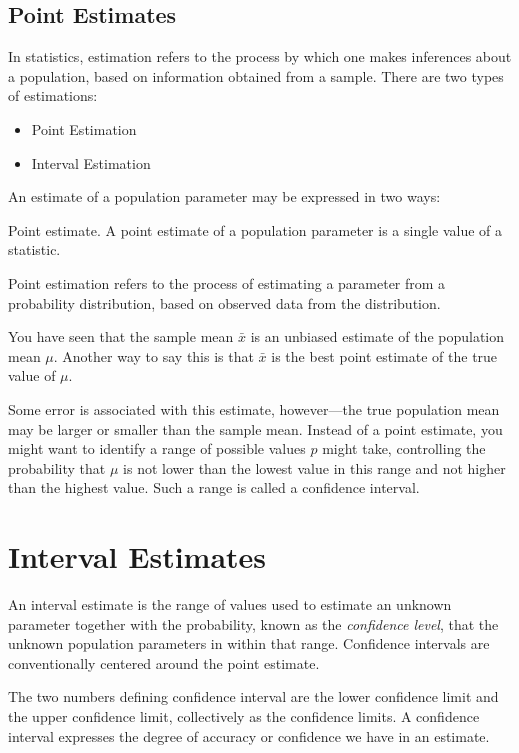 
\subsection{Point Estimates}

In statistics, estimation refers to the process by which one makes inferences about a population, based on information obtained from a sample.
There are two types of estimations:

\begin{itemize}
	\item Point Estimation
	\item Interval Estimation
\end{itemize}



An estimate of a population parameter may be expressed in two ways:

Point estimate. A point estimate of a population parameter is a single value of a statistic. 




Point estimation refers to the process of estimating a parameter from a probability 
distribution, based on observed data from the distribution. 





You have seen that the sample mean $\bar{x}$ is an unbiased estimate of the population mean $\mu$. 
Another way to say this is that $\bar{x}$  is the best point estimate of the true value of $\mu$. 



Some error is associated with this estimate, however—the true population mean may be larger 
or smaller than the sample mean. Instead of a point estimate, you might want to identify a 
range of possible values $p$ might take, controlling the probability that $\mu$ is not lower 
than the lowest value in this 
range and not higher than the highest value. Such a range is called a confidence interval.



\section{Interval Estimates}

An interval estimate is the range of values used to estimate an unknown parameter together with the probability, known as the \emph{confidence level}, that the unknown population parameters in within that range. Confidence intervals are conventionally centered around the point estimate.

The two numbers defining confidence interval are the lower confidence limit and the upper confidence limit, collectively as the confidence limits. A confidence interval expresses the degree of accuracy or confidence we have in an estimate.



